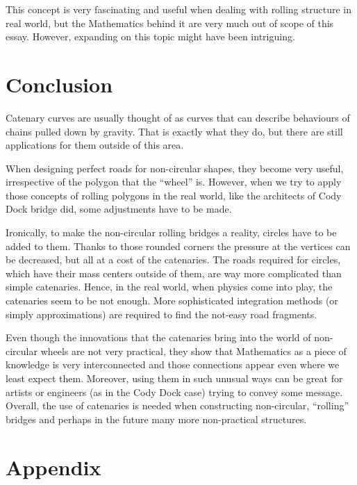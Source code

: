\documentclass[12pt]{article}
\begin{document}
        This concept is very fascinating and useful when dealing with rolling structure in real world, but the Mathematics behind it are very much out of scope of this essay. However, expanding on this topic might have been intriguing.

    \section{Conclusion}

        Catenary curves are usually thought of as curves that can describe behaviours of chains pulled down by gravity. That is exactly what they do, but there are still applications for them outside of this area.

        When designing perfect roads for non-circular shapes, they become very useful, irrespective of the polygon that the ``wheel'' is. However, when we try to apply those concepts of rolling polygons in the real world, like the architects of Cody Dock bridge did, some adjustments have to be made.

        Ironically, to make the non-circular rolling bridges a reality, circles have to be added to them. Thanks to those rounded corners the pressure at the vertices can be decreased, but all at a cost of the catenaries. The roads required for circles, which have their mass centers outside of them, are way more complicated than simple catenaries. Hence, in the real world, when physics come into play, the catenaries seem to be not enough. More sophisticated integration methods (or simply approximations) are required to find the not-easy road fragments.

        Even though the innovations that the catenaries bring into the world of non-circular wheels are not very practical, they show that Mathematics as a piece of knowledge is very interconnected and those connections appear even where we least expect them. Moreover, using them in such unusual ways can be great for artists or engineers (as in the Cody Dock case) trying to convey some message. Overall, the use of catenaries is needed when constructing non-circular, ``rolling'' bridges and perhaps in the future many more non-practical structures.

    \newpage
    
    

    \newpage
    \section*{Appendix}
    \appendix
    \renewcommand{\thesubsection}{\Alph{subsection}}
\end{document}

